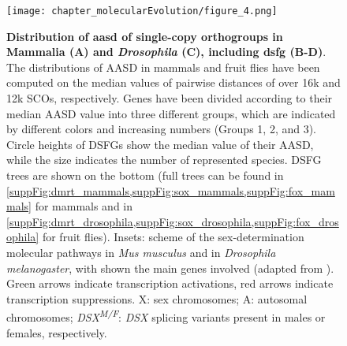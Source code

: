 \begin{figure}
	\centering
	\texttt{[image: chapter\_molecularEvolution/figure\_4.png]}
	\captionsetup[subfigure]{labelformat=nocaption}
	\begin{subfigure}{0\linewidth}
	\caption{}\label{fig:DSFG_testDivergence-A}
	\end{subfigure}%
	\begin{subfigure}{0\linewidth}
	\caption{}\label{fig:DSFG_testDivergence-B}
	\end{subfigure}%
	\begin{subfigure}{0\linewidth}
	\caption{}\label{fig:DSFG_testDivergence-C}
	\end{subfigure}%
	\begin{subfigure}{0\linewidth}
	\caption{}\label{fig:DSFG_testDivergence-D}
	\end{subfigure}
	\caption[\textbf{Distribution of \gls{aasd} of single-copy orthogroups in Mammalia (A) and \textit{Drosophila} (C), including \gls{dsfg} (B-D)}]
	{
		\textbf{Distribution of \gls{aasd} of single-copy orthogroups in Mammalia (A) and \textit{Drosophila} (C), including \gls{dsfg} (B-D)}. The distributions of AASD in mammals and fruit flies have been computed on the median values of pairwise distances of over 16k and 12k SCOs, respectively. Genes have been divided according to their median AASD value into three different groups, which are indicated by different colors and increasing numbers (Groups 1, 2, and 3). Circle heights of DSFGs show the median value of their AASD, while the size indicates the number of represented species. DSFG trees are shown on the bottom (full trees can be found in \cref{suppFig:dmrt_mammals,suppFig:sox_mammals,suppFig:fox_mammals} for mammals and in \cref{suppFig:dmrt_drosophila,suppFig:sox_drosophila,suppFig:fox_drosophila} for fruit flies). Insets: scheme of the sex-determination molecular pathways in \textit{Mus musculus} and in \textit{Drosophila melanogaster}, with shown the main genes involved (adapted from ). Green arrows indicate transcription activations, red arrows indicate transcription suppressions. X: sex chromosomes; A: autosomal chromosomes; \textit{DSX\textsuperscript{M/F}}: \textit{DSX} splicing variants present in males or females, respectively.
	}
	\label{fig:DSFG_testDivergence}
\end{figure}

